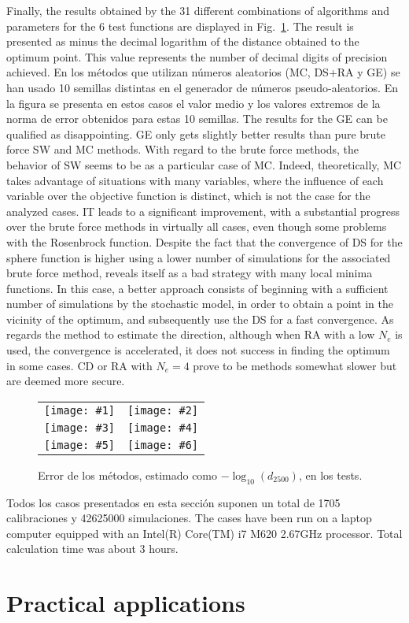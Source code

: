 \documentclass[review,authoryear]{elsarticle}
\newcommand{\FIGVI}[8]
{
	\begin{figure}[ht!]
		\centering
		\begin{tabular}{cc}
			\texttt{[image: \#1]} & \texttt{[image: \#2]} \\
			\texttt{[image: \#3]} & \texttt{[image: \#4]} \\
			\texttt{[image: \#5]} & \texttt{[image: \#6]}
		\end{tabular}
		\caption{#7.\label{#8}}
	\end{figure}
}
\newcommand{\PA}[1]{\left(#1\right)}
\begin{document}
Finally, the results obtained by the 31 different combinations of algorithms
and parameters for the 6 test functions are displayed in
Fig.~\ref{FigTestResults}. 
The result is presented as minus the decimal logarithm of the distance obtained
to the optimum point. This value represents the number of decimal digits of 
precision achieved.
En los métodos que utilizan números aleatorios (MC, DS+RA y GE) se han usado 10
semillas distintas en el generador de números pseudo-aleatorios. En la figura se
presenta en estos casos el valor medio y los valores extremos de la norma de
error obtenidos para estas 10 semillas.
The results for the GE can be qualified as disappointing. GE only gets slightly
better results than pure brute force SW and MC methods.
With regard to the brute force methods, the behavior of SW seems to be as a
particular case of MC. Indeed, theoretically, MC takes advantage of situations
with many variables, where the influence of each  variable over the objective
function is distinct, which is not the case for the analyzed cases.
IT leads to a significant improvement, with a substantial progress over the
brute force methods in virtually all cases, even though some problems with the
Rosenbrock function. 
Despite the fact that the convergence of DS for the sphere function is higher
using a lower number of simulations for the associated brute force method,
reveals itself as a bad strategy with many local minima functions. In this case,
a better approach consists of beginning with a sufficient number of simulations
by the stochastic model, in order to obtain a point in the vicinity of the
optimum, and subsequently use the DS for a fast convergence. As regards the
method to estimate the direction, although when RA with a low $N_e$ is used, the
convergence is accelerated, it does not success in finding the optimum in some
cases. CD or RA with $N_e=4$ prove to be methods somewhat slower but are deemed
more secure. 
\FIGVI{Sphere-e.eps}{Ackley-e.eps}{Booth-e.eps}{Rosenbrock-e.eps}{Easom-e.eps}
{Beale-e.eps}{Error de los métodos, estimado como $-\log_{10}\PA{d_{2500}}$, en
los tests}{FigTestResults}

Todos los casos presentados en esta sección suponen un total de 1705
calibraciones y 42625000 simulaciones. The cases have been run on a laptop
computer equipped with an Intel(R) Core(TM) i7 M620 2.67GHz processor. Total
calculation time was about 3 hours.

\section{Practical applications}
\end{document}
